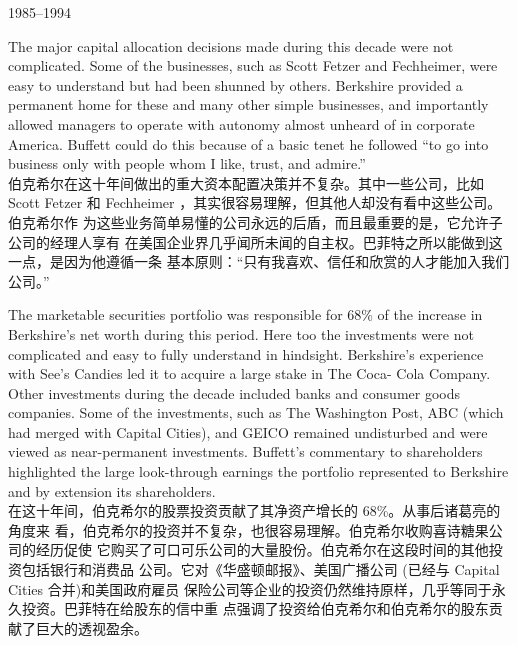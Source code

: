 \begin{section}{1985--1994}
\begin{verseparallel}
  {
    The major capital allocation decisions made during this decade were not
    complicated. Some of the businesses, such as Scott Fetzer and Fechheimer,
    were easy to understand but had been shunned by others. Berkshire provided a
    permanent home for these and many other simple businesses, and importantly
    allowed managers to operate with autonomy almost unheard of in corporate
    America. Buffett could do this because of a basic tenet he followed ``to go
    into business only with people whom I like, trust, and admire.'' \\
  }
  {
    伯克希尔在这十年间做出的重大资本配置决策并不复杂。其中一些公司，比如 Scott
    Fetzer 和 Fechheimer ，其实很容易理解，但其他人却没有看中这些公司。伯克希尔作
    为这些业务简单易懂的公司永远的后盾，而且最重要的是，它允许子公司的经理人享有
    在美国企业界几乎闻所未闻的自主权。巴菲特之所以能做到这一点，是因为他遵循一条
    基本原则：“只有我喜欢、信任和欣赏的人才能加入我们公司。”
  }
\end{verseparallel}

\begin{verseparallel}
  {
    The marketable securities portfolio was responsible for 68\% of the increase
    in Berkshire's net worth during this period. Here too the investments were
    not complicated and easy to fully understand in hindsight. Berkshire's
    experience with See's Candies led it to acquire a large stake in The Coca-
    Cola Company. Other investments during the decade included banks and
    consumer goods companies. Some of the investments, such as The Washington
    Post, ABC (which had merged with Capital Cities), and GEICO remained
    undisturbed and were viewed as near-permanent investments. Buffett's
    commentary to shareholders highlighted the large look-through earnings the portfolio represented to
    Berkshire and by extension its shareholders. \\
  }
  {
    在这十年间，伯克希尔的股票投资贡献了其净资产增长的 68\%。从事后诸葛亮的角度来
    看，伯克希尔的投资并不复杂，也很容易理解。伯克希尔收购喜诗糖果公司的经历促使
    它购买了可口可乐公司的大量股份。伯克希尔在这段时间的其他投资包括银行和消费品
    公司。它对《华盛顿邮报》、美国广播公司 (已经与 Capital Cities 合并)和美国政府雇员
    保险公司等企业的投资仍然维持原样，几乎等同于永久投资。巴菲特在给股东的信中重
    点强调了投资给伯克希尔和伯克希尔的股东贡献了巨大的透视盈余。
  }
\end{verseparallel}


\end{section}
